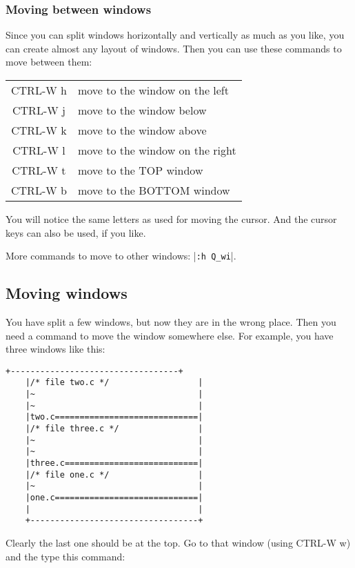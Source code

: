 \subsubsection{Moving between windows}
Since you can split windows horizontally and vertically as much as you like, you can create almost any layout of windows.
Then you can use these commands to move between them:

\begin{center}
				\begin{longtable}{c l}
				CTRL-W h & move to the window on the left\\
				CTRL-W j & move to the window below\\
				CTRL-W k & move to the window above\\
				CTRL-W l & move to the window on the right\\
				CTRL-W t & move to the TOP window\\
				CTRL-W b & move to the BOTTOM window\\
\end{longtable}
\end{center}

You will notice the same letters as used for moving the cursor.
And the cursor keys can also be used, if you like.

More commands to move to other windows: |\texttt{:h Q\_wi}|.
\subsection{Moving windows}
You have split a few windows, but now they are in the wrong place.
Then you need a command to move the window somewhere else.
For example, you have three windows like this:

\begin{Verbatim}[samepage=true]
    +----------------------------------+
    |/* file two.c */                  |
    |~                                 |
    |~                                 |
    |two.c=============================|
    |/* file three.c */                |
    |~                                 |
    |~                                 |
    |three.c===========================|
    |/* file one.c */                  |
    |~                                 |
    |one.c=============================|
    |                                  |
    +----------------------------------+
\end{Verbatim}

Clearly the last one should be at the top.
Go to that window (using CTRL-W w) and the type this command:

